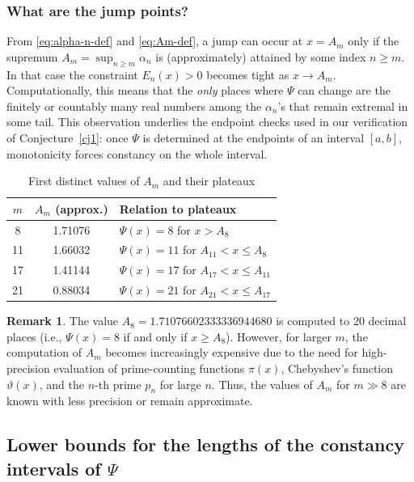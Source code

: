 \documentclass[10pt]{amsart}
\theoremstyle{definition} %
\newtheorem{remark}{Remark}[section]
\numberwithin{equation}{section}
\begin{document}
\subsubsection*{What are the jump points?}
From \eqref{eq:alpha-n-def} and \eqref{eq:Am-def}, a jump can occur at $x=A_m$ only if the supremum
$A_m=\sup_{n\ge m}\alpha_n$ is (approximately) attained by some index $n\ge m$. In that case the
constraint $E_n(x)>0$ becomes tight as $x\to A_m$. Computationally, this means that the
\emph{only} places where $\Psi$ can change are the finitely or countably many real numbers among
the $\alpha_n$’s that remain extremal in some tail. This observation underlies the endpoint checks
used in our verification of Conjecture~\ref{cj1}: once $\Psi$ is determined at the endpoints of an
interval $[a,b]$, monotonicity forces constancy on the whole interval.

\begin{table}[h!]
\centering
\caption{First distinct values of \(A_m\) and their plateaux}
\label{tab:Am-values}
\begin{tabular}{|c|c|l|}
\hline
\(m\) & \(A_m\) (approx.) & Relation to plateaux \\
\hline
8 & 1.71076 & \(\Psi(x) = 8\) for \(x > A_8\) \\
11 & 1.66032 & \(\Psi(x) = 11\) for \(A_{11} < x \leq A_8\) \\
17 & 1.41144 & \(\Psi(x) = 17\) for \(A_{17} < x \leq A_{11}\) \\
21 & 0.88034 & \(\Psi(x) = 21\) for \(A_{21} < x \leq A_{17}\) \\
\hline
\end{tabular}
\end{table}

\begin{remark}
The value \(A_8 = 1.71076602333336944680\) is computed to 20 decimal places (i.e., $\Psi(x)=8$ if and only if $x\geq A_8$). However, for larger \(m\), the computation of \(A_m\) becomes increasingly expensive due to the need for high-precision evaluation of prime-counting functions \(\pi(x)\), Chebyshev's function \(\vartheta(x)\), and the \(n\)-th prime \(p_n\) for large \(n\). Thus, the values of \(A_m\) for \(m \gg 8\) are known with less precision or remain approximate.
\end{remark}


\subsection{Lower bounds for the lengths of the constancy intervals of \texorpdfstring{$\Psi$}{Psi}}
\end{document}

